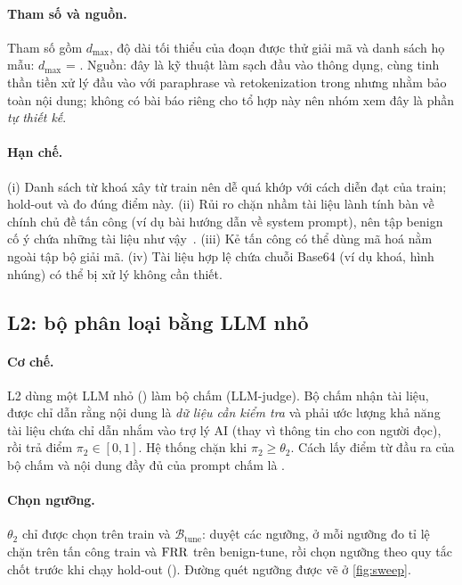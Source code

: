 \paragraph{Tham số và nguồn.} Tham số gồm $d_{\max}$, độ dài tối thiểu của đoạn được thử giải mã và danh sách họ mẫu: $d_{\max}$ = . Nguồn: đây là kỹ thuật làm sạch đầu vào thông dụng, cùng tinh thần tiền xử lý đầu vào với paraphrase và retokenization trong \citet{jain2023baseline} nhưng nhằm bảo toàn nội dung; không có bài báo riêng cho tổ hợp này nên nhóm xem đây là phần \emph{tự thiết kế}. \paragraph{Hạn chế.} (i) Danh sách từ khoá xây từ train nên dễ quá khớp với cách diễn đạt của train; hold-out và  đo đúng điểm này. (ii) Rủi ro chặn nhầm tài liệu lành tính bàn về chính chủ đề tấn công (ví dụ bài hướng dẫn về system prompt), nên tập benign cố ý chứa những tài liệu như vậy~\citep{li2024injecguard}. (iii) Kẻ tấn công có thể dùng mã hoá nằm ngoài tập bộ giải mã. (iv) Tài liệu hợp lệ chứa chuỗi Base64 (ví dụ khoá, hình nhúng) có thể bị xử lý không cần thiết.

\subsection{L2: bộ phân loại bằng LLM nhỏ}
\paragraph{Cơ chế.} L2 dùng một LLM nhỏ (\texttt{\judgeid}) làm bộ chấm (LLM-judge). Bộ chấm nhận tài liệu, được chỉ dẫn rằng nội dung là \emph{dữ liệu cần kiểm tra} và phải ước lượng khả năng tài liệu chứa chỉ dẫn nhắm vào trợ lý AI (thay vì thông tin cho con người đọc), rồi trả điểm $\pi_2\in[0,1]$. Hệ thống chặn khi $\pi_2 \ge \theta_2$. Cách lấy điểm từ đầu ra của bộ chấm và nội dung đầy đủ của prompt chấm là .

\paragraph{Chọn ngưỡng.} $\theta_2$ chỉ được chọn trên train và $\mathcal{B}_{\mathrm{tune}}$: duyệt các ngưỡng, ở mỗi ngưỡng đo tỉ lệ chặn trên tấn công train và $\mathrm{FRR}$ trên benign-tune, rồi chọn ngưỡng theo quy tắc chốt trước khi chạy hold-out (). Đường quét ngưỡng được vẽ ở \cref{fig:sweep}.


